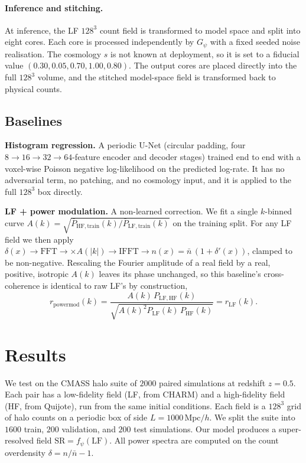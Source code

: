 \documentclass{article} %
\begin{document}
\paragraph{Inference and stitching.}
At inference, the LF $128^3$ count field is transformed to model space and split
into eight cores. Each core is processed independently by $G_\psi$ with a fixed
seeded noise realisation. The cosmology $s$ is not known at deployment, so it is set
to a fiducial value $(0.30, 0.05, 0.70, 1.00, 0.80)$. The output cores are placed
directly into the full $128^3$ volume, and the stitched model-space field is
transformed back to physical counts.

\subsection{Baselines}

\textbf{Histogram regression.} A periodic U-Net (circular padding, four
$8{\to}16{\to}32{\to}64$-feature encoder and decoder stages) trained end to end with
a voxel-wise Poisson negative log-likelihood on the predicted log-rate. It has no
adversarial term, no patching, and no cosmology input, and it is applied to the
full $128^3$ box directly.

\textbf{LF + power modulation.} A non-learned correction. We fit a single
$k$-binned curve
$A(k)=\sqrt{\bar P_{\mathrm{HF,train}}(k)/\bar P_{\mathrm{LF,train}}(k)}$ on the
training split. For any LF field we then apply
$\delta(x)\to\mathrm{FFT}\to\times A(|k|)\to\mathrm{IFFT}\to
n(x)=\bar n\,(1+\delta'(x))$, clamped to be non-negative. Rescaling the Fourier
amplitude of a real field by a real, positive, isotropic $A(k)$ leaves its phase
unchanged, so this baseline's cross-coherence is identical to raw LF's by
construction,
\begin{equation}
    r_{\mathrm{powermod}}(k)
    =
    \frac{A(k)\,P_{\mathrm{LF,HF}}(k)}{\sqrt{A(k)^2 P_{\mathrm{LF}}(k)\,P_{\mathrm{HF}}(k)}}
    =
    r_{\mathrm{LF}}(k).
    \label{eq:powermod}
\end{equation}

\section{Results}

We test on the CMASS halo suite of $2000$ paired simulations at redshift $z=0.5$.
Each pair has a low-fidelity field (LF, from CHARM) and a high-fidelity field (HF,
from Quijote), run from the same initial conditions. Each field is a $128^3$ grid of
halo counts on a periodic box of side $L=1000\,\mathrm{Mpc}/h$. We split the suite
into $1600$ train, $200$ validation, and $200$ test simulations. Our model produces
a super-resolved field $\mathrm{SR}=f_\psi(\mathrm{LF})$. All power spectra are
computed on the count overdensity $\delta = n/\bar n - 1$.
\end{document}
